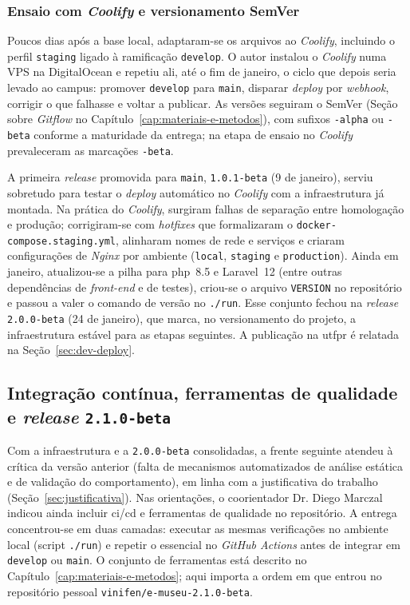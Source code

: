 \subsubsection{Ensaio com \textit{Coolify} e versionamento SemVer}

Poucos dias após a base local, adaptaram-se os arquivos ao \textit{Coolify}, incluindo o perfil \texttt{staging} ligado à ramificação \texttt{develop}. O autor instalou o \textit{Coolify} numa VPS na DigitalOcean e repetiu ali, até o fim de janeiro, o ciclo que depois seria levado ao campus: promover \texttt{develop} para \texttt{main}, disparar \textit{deploy} por \textit{webhook}, corrigir o que falhasse e voltar a publicar. As versões seguiram o SemVer (Seção sobre \textit{Gitflow} no Capítulo~\ref{cap:materiais-e-metodos}), com sufixos \texttt{-alpha} ou \texttt{-beta} conforme a maturidade da entrega; na etapa de ensaio no \textit{Coolify} prevaleceram as marcações \texttt{-beta}.

A primeira \textit{release} promovida para \texttt{main}, \texttt{1.0.1-beta} (9 de janeiro), serviu sobretudo para testar o \textit{deploy} automático no \textit{Coolify} com a infraestrutura já montada. Na prática do \textit{Coolify}, surgiram falhas de separação entre homologação e produção; corrigiram-se com \textit{hotfixes} que formalizaram o \texttt{docker-compose.staging.yml}, alinharam nomes de rede e serviços e criaram configurações de \textit{Nginx} por ambiente (\texttt{local}, \texttt{staging} e \texttt{production}). Ainda em janeiro, atualizou-se a pilha para \acrshort{php}~8.5 e Laravel~12 (entre outras dependências de \textit{front-end} e de testes), criou-se o arquivo \texttt{VERSION} no repositório e passou a valer o comando de versão no \texttt{./run}. Esse conjunto fechou na \textit{release} \texttt{2.0.0-beta} (24 de janeiro), que marca, no versionamento do projeto, a infraestrutura estável para as etapas seguintes. A publicação na \acrshort{utfpr} é relatada na Seção~\ref{sec:dev-deploy}.

\subsection{Integração contínua, ferramentas de qualidade e \textit{release} \texttt{2.1.0-beta}}\label{sec:dev-infra-ci}

Com a infraestrutura e a \texttt{2.0.0-beta} consolidadas, a frente seguinte atendeu à crítica da versão anterior (falta de mecanismos automatizados de análise estática e de validação do comportamento), em linha com a justificativa do trabalho (Seção~\ref{sec:justificativa}). Nas orientações, o coorientador Dr. Diego Marczal indicou ainda incluir \acrfull{ci/cd} e ferramentas de qualidade no repositório. A entrega concentrou-se em duas camadas: executar as mesmas verificações no ambiente local (script \texttt{./run}) e repetir o essencial no \textit{GitHub Actions} antes de integrar em \texttt{develop} ou \texttt{main}. O conjunto de ferramentas está descrito no Capítulo~\ref{cap:materiais-e-metodos}; aqui importa a ordem em que entrou no repositório pessoal \texttt{vinifen/e-museu-2.1.0-beta}.

